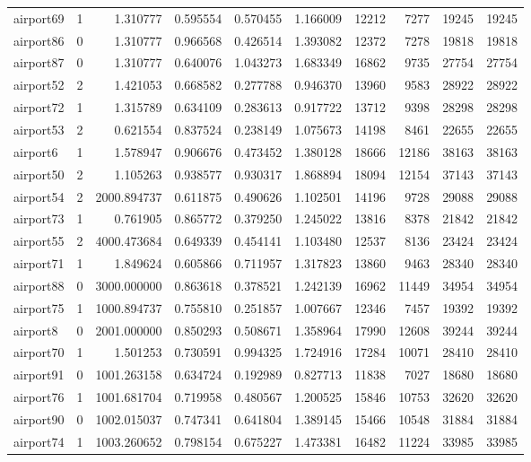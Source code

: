 \begin{longtable}{|l|r|r|r|r|r|r|r|r|r|}
airport69 & 1 & 1.310777 & 0.595554 & 0.570455 & 1.166009 & 12212 & 7277 & 19245 & 19245 \\
airport86 & 0 & 1.310777 & 0.966568 & 0.426514 & 1.393082 & 12372 & 7278 & 19818 & 19818 \\
airport87 & 0 & 1.310777 & 0.640076 & 1.043273 & 1.683349 & 16862 & 9735 & 27754 & 27754 \\
airport52 & 2 & 1.421053 & 0.668582 & 0.277788 & 0.946370 & 13960 & 9583 & 28922 & 28922 \\
airport72 & 1 & 1.315789 & 0.634109 & 0.283613 & 0.917722 & 13712 & 9398 & 28298 & 28298 \\
airport53 & 2 & 0.621554 & 0.837524 & 0.238149 & 1.075673 & 14198 & 8461 & 22655 & 22655 \\
airport6 & 1 & 1.578947 & 0.906676 & 0.473452 & 1.380128 & 18666 & 12186 & 38163 & 38163 \\
airport50 & 2 & 1.105263 & 0.938577 & 0.930317 & 1.868894 & 18094 & 12154 & 37143 & 37143 \\
airport54 & 2 & 2000.894737 & 0.611875 & 0.490626 & 1.102501 & 14196 & 9728 & 29088 & 29088 \\
airport73 & 1 & 0.761905 & 0.865772 & 0.379250 & 1.245022 & 13816 & 8378 & 21842 & 21842 \\
airport55 & 2 & 4000.473684 & 0.649339 & 0.454141 & 1.103480 & 12537 & 8136 & 23424 & 23424 \\
airport71 & 1 & 1.849624 & 0.605866 & 0.711957 & 1.317823 & 13860 & 9463 & 28340 & 28340 \\
airport88 & 0 & 3000.000000 & 0.863618 & 0.378521 & 1.242139 & 16962 & 11449 & 34954 & 34954 \\
airport75 & 1 & 1000.894737 & 0.755810 & 0.251857 & 1.007667 & 12346 & 7457 & 19392 & 19392 \\
airport8 & 0 & 2001.000000 & 0.850293 & 0.508671 & 1.358964 & 17990 & 12608 & 39244 & 39244 \\
airport70 & 1 & 1.501253 & 0.730591 & 0.994325 & 1.724916 & 17284 & 10071 & 28410 & 28410 \\
airport91 & 0 & 1001.263158 & 0.634724 & 0.192989 & 0.827713 & 11838 & 7027 & 18680 & 18680 \\
airport76 & 1 & 1001.681704 & 0.719958 & 0.480567 & 1.200525 & 15846 & 10753 & 32620 & 32620 \\
airport90 & 0 & 1002.015037 & 0.747341 & 0.641804 & 1.389145 & 15466 & 10548 & 31884 & 31884 \\
airport74 & 1 & 1003.260652 & 0.798154 & 0.675227 & 1.473381 & 16482 & 11224 & 33985 & 33985 \\

\end{longtable}
